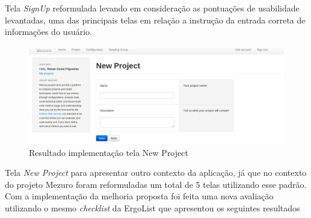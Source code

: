 Tela \textit{SignUp} reformulada levando em consideração as pontuações de usabilidade levantadas, uma das principais telas em relação a instrução da entrada correta de informações do usuário.

\graphicspath{{figuras/}}
\begin{figure}[H]
\centering
\includegraphics[width=1.0\textwidth]{TelaNewProject}
\caption{Resultado implementação tela New Project}
\label{parallel-coordinate}
\end{figure}

Tela \textit{New Project} para apresentar outro contexto da aplicação, já que no contexto do projeto Mezuro foram reformuladas um total de 5 telas utilizando esse padrão. Com a implementação da melhoria proposta foi feita uma nova avaliação utilizando o mesmo \textit{checklist} da ErgoList que apresentou os seguintes resultados

